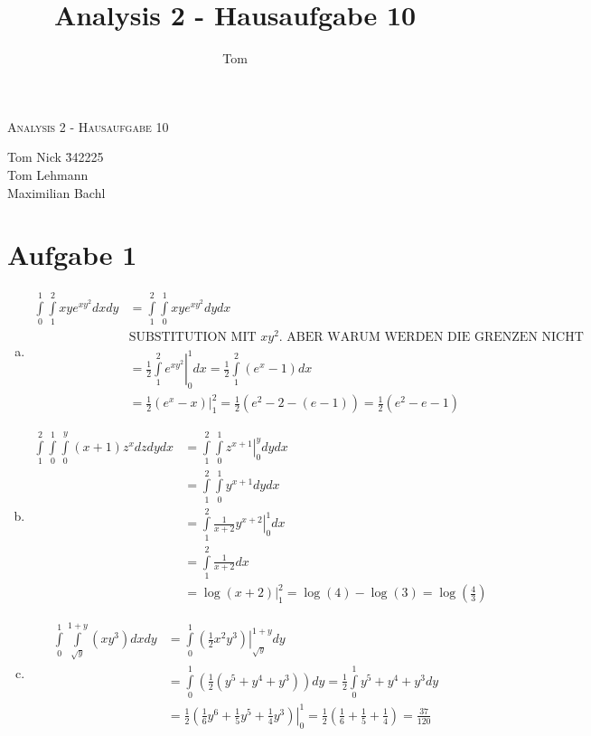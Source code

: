 \documentclass[10pt,a4paper,parskip=half]{scrartcl}
\author{Tom}
\title{Analysis 2 - Hausaufgabe 10}
\begin{document}
\begin{center}
\textsc{\Large{Analysis 2 - Hausaufgabe 10}} \\
\end{center}
\begin{tabbing}
Tom Nick \hspace{1.4cm}\= 342225\\
Tom Lehmann\\
Maximilian Bachl
\end{tabbing}
\section*{Aufgabe 1}
\begin{enumerate}[a)]
   \item 
            \begin{align*}
               \int\limits^{1}_0\int\limits^{2}_{1}xye^{xy^2} dxdy &= \int\limits^{2}_{1}\int\limits^{1}_0xye^{xy^2} dydx \\
               &\text{SUBSTITUTION MIT $xy^2$. ABER WARUM WERDEN DIE GRENZEN NICHT ANGEPASST?}\\
               &= \frac 12 \left. \int\limits^{2}_{1} e^{xy^2} \right|^1_0 dx = \frac 12 \int\limits^{2}_{1} (e^x - 1) dx \\
               &= \frac 12 (e^x - x)|^2_1 = \frac 12 (e^2 - 2 - (e - 1)) = \frac 12 (e^2 - e - 1)
            \end{align*}
   \item 
            \begin{align*}
               \int\limits^{2}_{1}\int\limits^1_0\int\limits^y_0(x+1)z^x dzdydx &= \int\limits^{2}_{1}\int\limits^1_0 \left. z^{x+1} \right|^y_0 dydx \\
               &= \int\limits^{2}_{1}\int\limits^1_0 y^{x+1} dydx \\
               &= \int\limits^{2}_{1}\left. \frac 1 {x+2} y^{x+2} \right|^1_0 dx \\
               &= \int\limits^{2}_{1}\frac 1 {x+2} dx \\
               &= \left.\log(x+2)\right|^2_1 = \log(4) - \log(3) = \log\left(\frac 4 3\right)
            \end{align*}
   \item 
            \begin{align*}
               \int\limits^{1}_{0}\int\limits^{1+y}_{\sqrt{y}}(xy^3) dxdy &=   \int\limits^{1}_{0} \left. (\frac 1 2 x^2y^3) \right|^{1+y}_{\sqrt{y}} dy \\
               &=   \int\limits^{1}_{0} (\frac 1 2 (y^5 + y^4 + y^3))  dy = \frac 1 2 \int\limits^{1}_{0} y^5 + y^4 + y^3  dy \\
               &= \left.\frac 1 2\left( \frac 16 y^6 + \frac 15 y^5 + \frac 14 y^3 \right)\right|^1_0 = \frac 12\left( \frac 16 + \frac 15 + \frac 14 \right) = \frac{37}{120}
            \end{align*}
\end{enumerate}
\end{document}
